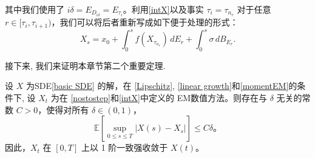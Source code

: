 其中我们使用了 \( i\delta = E_{D_{i\delta}} = E_{\tau_i} \)。利用\cref{intX}以及事实 \(\tau_i = \tau_{n_r}\) 对于任意 \( r \in [\tau_i, \tau_{i+1}) \)，我们可以将后者重新写成如下便于处理的形式：
\begin{equation}\label{intX}
	X_s = x_0 + \int_{0}^{s} f\left(X_{\tau_{n_r}}\right) \, dE_r + \int_{0}^{s} \sigma \, dB_{E_r}.
\end{equation}


接下来, 我们来证明本章节第二个重要定理. 
\begin{theorem}\label{main th EM1}
	设 $X$ 为SDE\textnormal{\cref{basic SDE} }的解，在 \textnormal{\cref{Lipschitz}}, \textnormal{\cref{linear growth}}和\textnormal{\cref{momentEM}}的条件下, 
	设 $X_t$ 为在 \textnormal{\cref{nostostep}}和\textnormal{\cref{intX}}中定义的 EM数值方法。则存在与 $\delta$ 无关的常数 $C > 0$，使得对所有 $\delta \in (0,1)$，
	\[
	\mathbb{E} \left[ \sup_{0 \leq s \leq T} | X(s) - X_s | \right] \leq C \delta。
	\]
	因此，$X_t$ 在 $[0, T]$ 上以 1 阶一致强收敛于 $X(t)$。
\end{theorem}

